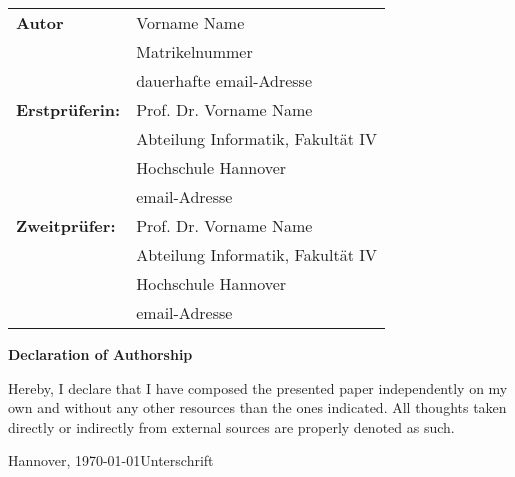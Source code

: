 \thispagestyle{empty}
\begin{tabular}{ll}
  {\bfseries\sffamily Autor}         & Vorname Name                      \\
                                     & Matrikelnummer                    \\
                                     & dauerhafte email-Adresse          \\[5ex]
  {\bfseries\sffamily Erstprüferin:} & Prof. Dr. Vorname Name            \\
                                     & Abteilung Informatik, Fakultät IV \\
                                     & Hochschule Hannover               \\
                                     & email-Adresse                     \\[5ex]
  {\bfseries\sffamily Zweitprüfer:}  & Prof. Dr. Vorname Name            \\
                                     & Abteilung Informatik, Fakultät IV \\
                                     & Hochschule Hannover               \\
                                     & email-Adresse
\end{tabular}

\vfill

\begin{center} \sffamily\bfseries Declaration of Authorship \end{center}

Hereby, I declare that I have composed the presented paper independently on 
my own and without any other resources than the ones indicated. All thoughts
taken directly or indirectly from external sources are properly denoted as such.
\vspace*{7ex}

Hannover, \today \hfill Unterschrift
\newpage